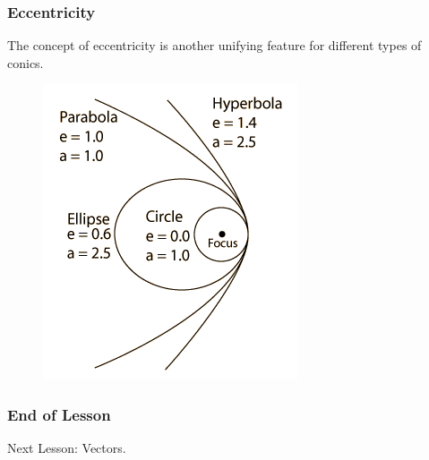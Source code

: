 \documentclass[xcolor=dvipsnames]{beamer}
\begin{document}
\begin{frame}
  \frametitle{Eccentricity}
The concept of eccentricity is another unifying feature for different
types of conics.
  \begin{figure}[h]
    \includegraphics[scale=.65]{./conorb.png}
  \end{figure}
\end{frame}

\begin{frame}
  \frametitle{End of Lesson}
Next Lesson: Vectors.
\end{frame}
\end{document}
